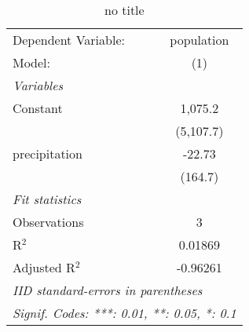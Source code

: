 
\begin{table}[htbp]
   \caption{no title}
   \centering
   \begin{tabular}{lc}
      \tabularnewline \midrule \midrule
      Dependent Variable: & population\\  
      Model:              & (1)\\  
      \midrule
      \emph{Variables}\\
      Constant            & 1,075.2\\   
                          & (5,107.7)\\   
      precipitation       & -22.73\\   
                          & (164.7)\\   
      \midrule
      \emph{Fit statistics}\\
      Observations        & 3\\  
      R$^2$               & 0.01869\\  
      Adjusted R$^2$      & -0.96261\\  
      \midrule \midrule
      \multicolumn{2}{l}{\emph{IID standard-errors in parentheses}}\\
      \multicolumn{2}{l}{\emph{Signif. Codes: ***: 0.01, **: 0.05, *: 0.1}}\\
   \end{tabular}
\end{table}


